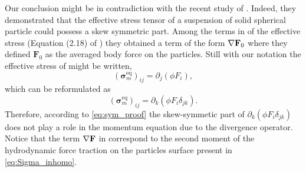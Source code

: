 Our conclusion might be in contradiction with the recent study of \cite{wolgemuth2023continuum}.
Indeed, they demonstrated that the effective stress tensor of a suspension of solid spherical particle could possess a skew symmetric part. 
Among the terms in of the effective stress (Equation (2.18) of \cite{wolgemuth2023continuum}) they obtained a term of the form $\mathbf{\nabla} \textbf{F}_0$ where they defined $\textbf{F}_0$ as the averaged body force on the particles. 
Still with our notation the effective stress of \citet{wolgemuth2023continuum} might be written, 
\begin{equation*}
    (\bm\sigma^\text{eq}_m)_{ij}
    = \partial_j(\phi F_i),
\end{equation*}
which can be reformulated as 
\begin{equation*}
    (\bm\sigma^\text{eq}_m)_{ij}
    = \partial_k(\phi F_i \delta_{jk}). 
\end{equation*}
Therefore, according to \ref{eq:sym_proof} the skew-symmetic part of $\partial_k(\phi F_i \delta_{jk})$ does not play a role in the momentum equation due to the divergence operator. 
Notice that the term $\mathbf{\nabla} \textbf{F}$ in \citet{wolgemuth2023continuum} correspond to the second moment of the hydrodynamic force traction on the particles surface present in \ref{eq:Sigma_inhomo}. 


